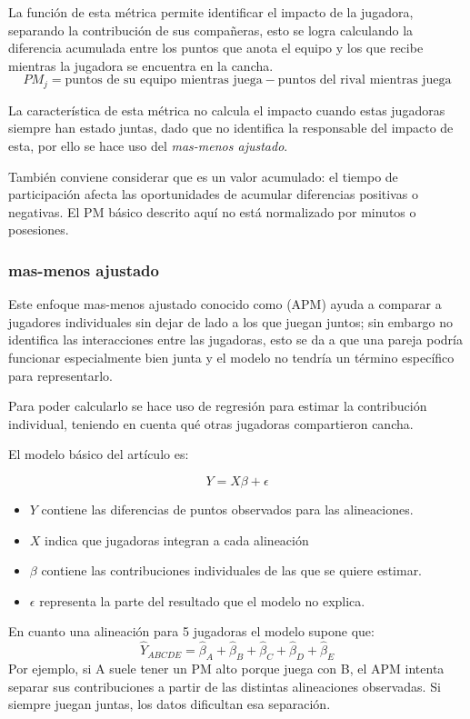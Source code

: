 La función de esta métrica permite identificar el impacto de la jugadora, separando la contribución de sus compañeras, esto se logra calculando la diferencia acumulada entre los puntos que anota el equipo y los que recibe mientras la jugadora se encuentra en la cancha.
$$PM_j=\text{puntos de su equipo mientras juega}- \text{puntos del rival mientras juega}$$

La característica de esta métrica no calcula el impacto cuando estas jugadoras siempre han estado juntas, dado que no identifica la responsable del impacto de esta, por ello se hace uso del \textit{mas-menos ajustado}.

También conviene considerar que es un valor acumulado: el tiempo de participación afecta las oportunidades de acumular diferencias positivas o negativas. El PM básico descrito aquí no está normalizado por minutos o posesiones.
\cite{josephs2025hypergraphadjustedplusminus}

\subsubsection{mas-menos ajustado}
Este enfoque mas-menos ajustado conocido como (APM) ayuda a comparar a jugadores individuales sin dejar de lado a los que juegan juntos; sin embargo no identifica las interacciones entre las jugadoras, esto se da a que una pareja podría funcionar especialmente bien junta y el modelo no tendría un término específico para representarlo.

Para poder calcularlo se hace uso de regresión para estimar la contribución individual, teniendo en cuenta qué otras jugadoras compartieron cancha.

El modelo básico del artículo es:

$$Y=X\beta+\epsilon$$

\begin{itemize}
    \item $Y$ contiene las diferencias de puntos observados para las alineaciones.
    \item $X$ indica que jugadoras integran a cada alineación
    \item $\beta$ contiene las contribuciones individuales de las que se quiere estimar.
    \item $\epsilon$ representa la parte del resultado que el modelo no explica.
\end{itemize}

En cuanto una alineación para 5 jugadoras el modelo supone que:
$$\hat{Y}_{ABCDE}=\hat{\beta}_A+\hat{\beta}_B+\hat{\beta}_C+\hat{\beta}_D+\hat{\beta}_E$$
Por ejemplo, si A suele tener un PM alto porque juega con B, el APM intenta separar sus contribuciones a partir de las distintas alineaciones observadas. Si siempre juegan juntas, los datos dificultan esa separación.

